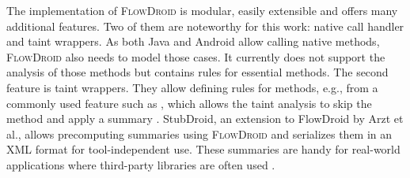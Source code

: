 \documentclass[../draft.tex]{subfiles}
\begin{document}
    The implementation of \textsc{FlowDroid} is modular, easily extensible and offers many additional features.
    Two of them are noteworthy for this work: native call handler and taint wrappers.
    As both Java and Android allow calling native methods, \textsc{FlowDroid} also needs to model those cases.
    It currently does not support the analysis of those methods but contains rules for essential methods.
    The second feature is taint wrappers.
    They allow defining rules for methods, e.g., from a commonly used feature such as , which allows the taint analysis to skip the method and apply a summary \cite{Arzt2014}.
    StubDroid, an extension to FlowDroid by Arzt et al., allows precomputing summaries using \textsc{FlowDroid} and serializes them in an XML format for tool-independent use.
    These summaries are handy for real-world applications where third-party libraries are often used \cite{Arzt2016}.
\end{document}
